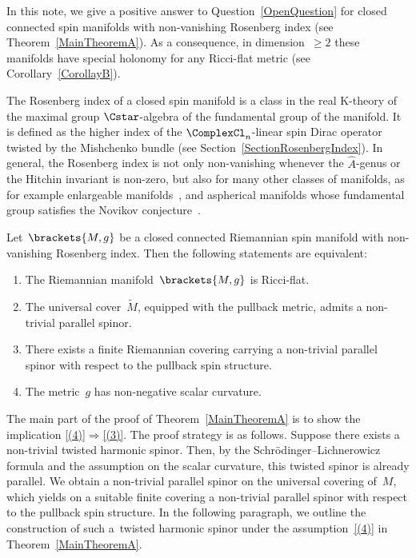 \documentclass[10pt,a4paper]{amsart}
\numberwithin{equation}{section}
\begin{document}
In this note, we give a positive answer to Question~\ref{OpenQuestion} for closed connected spin manifolds with non-vanishing Rosenberg index (see Theorem~\ref{MainTheoremA}). As a consequence, in dimension~$\geq 2$ these manifolds have special holonomy for any Ricci-flat metric (see Corollary~\ref{CorollayB}).

The Rosenberg index of a closed spin manifold is a class in the real K-theory of the maximal group $\Cstar$-algebra of the fundamental group of the manifold. It is defined as the higher index of the $\ComplexCl_n$-linear spin Dirac operator twisted by the Mishchenko bundle (see Section~\ref{SectionRosenbergIndex}). In general, the Rosenberg index is not only non-vanishing whenever the $\hat{A}$-genus or the Hitchin invariant is non-zero, but also for many other classes of manifolds, as for example enlargeable manifolds~\cite{Hanke2006, Hanke2007}, and aspherical manifolds whose fundamental group satisfies the Novikov conjecture~\cite{Rosenberg1983}.
%

\begin{prethm} \label{MainTheoremA}
 Let~$\brackets{M,g}$ be a closed connected Riemannian spin manifold with non-vanishing Rosenberg index. Then the following statements are equivalent:
 \begin{enumerate}\itemsep=0pt
 \item \label{(1)}
 The Riemannian manifold~$\brackets{M,g}$ is Ricci-flat.
 \item \label{(2)}
 The universal cover~$\tilde{M}$, equipped with the pullback metric, admits a non-trivial parallel spinor.
 \item \label{(3)}
 There exists a finite Riemannian covering carrying a non-trivial parallel spinor with respect to the pullback spin structure.
 \item \label{(4)}
 The metric~$g$ has non-negative scalar curvature.
 \end{enumerate}
\end{prethm}


The main part of the proof of Theorem~\ref{MainTheoremA} is to show the implication \ref{(4)}$\Rightarrow$\ref{(3)}. The proof strategy is as follows. Suppose there exists a non-trivial twisted harmonic spinor. Then, by the Schr\"odinger--Lichnerowicz formula and the assumption on the scalar curvature, this twisted spinor is already parallel. We obtain a non-trivial parallel spinor on the universal covering of~$M$, which yields on a suitable finite covering a non-trivial parallel spinor with respect to the pullback spin structure. In the following paragraph, we outline the construction of such a~twisted harmonic spinor under the assumption~\ref{(4)} in Theorem~\ref{MainTheoremA}.
\end{document}
